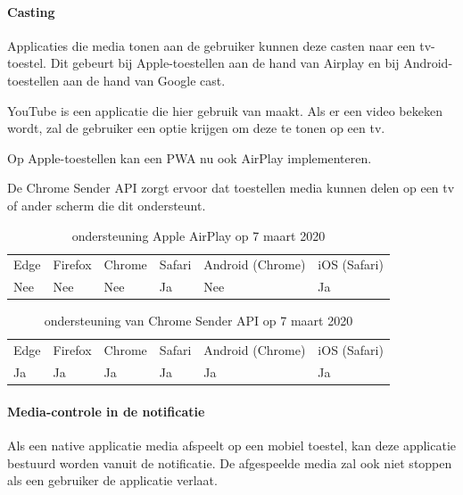 	
	
	
	\paragraph{Casting}
	
	Applicaties die media tonen aan de gebruiker kunnen deze casten naar een tv-toestel. Dit gebeurt bij Apple-toestellen aan de hand van Airplay en bij Android-toestellen aan de hand van Google cast.
	
	YouTube is een applicatie die hier gebruik van maakt. Als er een video bekeken wordt, zal de gebruiker een optie krijgen om deze te tonen op een tv.
	
	Op Apple-toestellen kan een PWA nu ook AirPlay implementeren. 
	\autocite{Apple2020a}
	
	De Chrome Sender API \autocite{Developers2020b} zorgt ervoor dat toestellen media kunnen delen op een tv of ander scherm die dit ondersteunt.
	
	\begin{table}[H]
		\centering
		\begin{tabular}{llllll}
			Edge & Firefox & Chrome & Safari & Android (Chrome) & iOS (Safari) \\
			Nee   & Nee      & Nee     & Ja     & Nee               & Ja          
		\end{tabular}	
		\caption{ondersteuning Apple AirPlay op 7 maart 2020}
	\end{table}
	\begin{table}[H]
		\centering
		\begin{tabular}{llllll}
			Edge & Firefox & Chrome & Safari & Android (Chrome) & iOS (Safari) \\
			Ja   & Ja      & Ja     & Ja     & Ja               & Ja          
		\end{tabular}	
		\caption{ondersteuning van Chrome Sender API op 7 maart 2020}
	\end{table}
	
	
	
	
	\paragraph{Media-controle in de notificatie }
	
	
	Als een native applicatie media afspeelt op een mobiel toestel, kan deze applicatie bestuurd worden vanuit de notificatie. De afgespeelde media zal ook niet stoppen als een gebruiker de applicatie verlaat.
	
